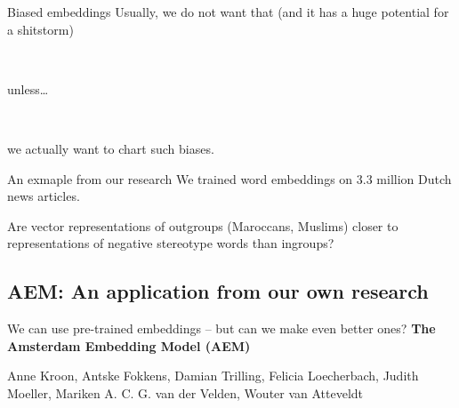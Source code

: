 \begin{frame}{Biased embeddings}
  Usually, we do not want that (and it has a huge potential for a shitstorm)
  
  ~\\
  \pause
  
	unless\ldots
	
	~\\
	\pause
	
	we actually want to chart such biases.
	
\end{frame}


\begin{frame}{An exmaple from our research \parencite{Kroon2021}}
	We trained word embeddings on 3.3 million Dutch news articles.
	
	Are vector representations of outgroups (Maroccans, Muslims) closer to representations of negative stereotype words than ingroups?

\end{frame}


\begin{frame}[plain]
	
\end{frame}


\subsection[AEM]{AEM: An application from our own research}

\begin{frame}[plain]
	We can use pre-trained embeddings -- but can we make even better ones?
	\textbf{The Amsterdam Embedding Model (AEM)}\\
	
	
	\vspace{1cm}
	
	{\footnotesize{Anne Kroon, Antske Fokkens, Damian Trilling, Felicia Loecherbach, Judith Moeller, Mariken A. C. G. van der Velden, Wouter van Atteveldt} }
\end{frame}





